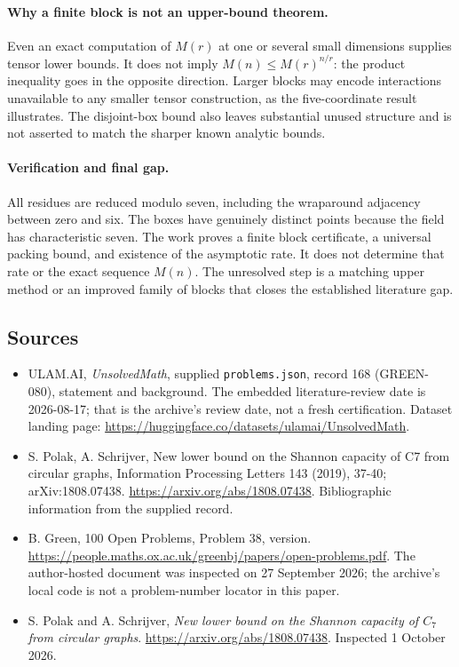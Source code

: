 \documentclass[11pt,a4paper]{article}
\begin{document}
\paragraph{Why a finite block is not an upper-bound theorem.}
Even an exact computation of $M(r)$ at one or several small dimensions supplies tensor lower bounds. It does not imply $M(n)\leq M(r)^{n/r}$: the product inequality goes in the opposite direction. Larger blocks may encode interactions unavailable to any smaller tensor construction, as the five-coordinate result illustrates. The disjoint-box bound also leaves substantial unused structure and is not asserted to match the sharper known analytic bounds.

\paragraph{Verification and final gap.}
All residues are reduced modulo seven, including the wraparound adjacency between zero and six. The boxes have genuinely distinct points because the field has characteristic seven. The work proves a finite block certificate, a universal packing bound, and existence of the asymptotic rate. It does not determine that rate or the exact sequence $M(n)$. The unresolved step is a matching upper method or an improved family of blocks that closes the established literature gap.

\subsection{Sources}

{\small

\begin{itemize}

\item[\hypertarget{source:168:1}{S1}] ULAM.AI, \emph{UnsolvedMath}, supplied \texttt{problems.json}, record 168 (GREEN-080), statement and background. The embedded literature-review date is 2026-08-17; that is the archive’s review date, not a fresh certification. Dataset landing page: \url{https://huggingface.co/datasets/ulamai/UnsolvedMath}.

\item[\hypertarget{source:168:2}{S2}] S. Polak, A. Schrijver, New lower bound on the Shannon capacity of C7 from circular graphs, Information Processing Letters 143 (2019), 37-40; arXiv:1808.07438. \url{https://arxiv.org/abs/1808.07438}. Bibliographic information from the supplied record.

\item[\hypertarget{source:168:3}{S3}] B. Green, 100 Open Problems, Problem 38, version. \url{https://people.maths.ox.ac.uk/greenbj/papers/open-problems.pdf}. The author-hosted document was inspected on 27 September 2026; the archive’s local code is not a problem-number locator in this paper.

\item[E1] S. Polak and A. Schrijver, \emph{New lower bound on the Shannon capacity of $C_7$ from circular graphs}. \url{https://arxiv.org/abs/1808.07438}. Inspected 1 October 2026.

\end{itemize}

}

\label{end:168}
\end{document}
